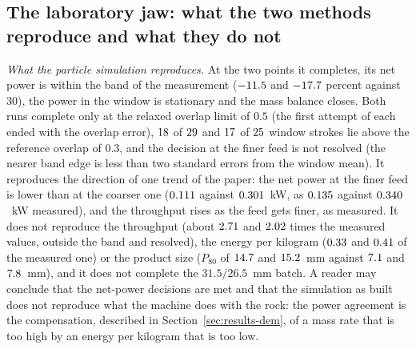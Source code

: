 \subsection{The laboratory jaw: what the two methods reproduce and what they do not}\label{sec:disc-dem}

\emph{What the particle simulation reproduces.} At the two points it completes, its net power is within the band of the measurement ($-11.5$ and $-17.7$ percent against $30$), the power in the window is stationary and the mass balance closes. Both runs complete only at the relaxed overlap limit of $0.5$ (the first attempt of each ended with the overlap error), $18$ of $29$ and $17$ of $25$ window strokes lie above the reference overlap of $0.3$, and the decision at the finer feed is not resolved (the nearer band edge is less than two standard errors from the window mean). It reproduces the direction of one trend of the paper: the net power at the finer feed is lower than at the coarser one ($0.111$ against $0.301$~kW, as $0.135$ against $0.340$~kW measured), and the throughput rises as the feed gets finer, as measured. It does not reproduce the throughput (about $2.71$ and $2.02$ times the measured values, outside the band and resolved), the energy per kilogram ($0.33$ and $0.41$ of the measured one) or the product size ($P_{80}$ of $14.7$ and $15.2$~mm against $7.1$ and $7.8$~mm), and it does not complete the $31.5/26.5$~mm batch. A reader may conclude that the net-power decisions are met and that the simulation as built does not reproduce what the machine does with the rock: the power agreement is the compensation, described in Section~\ref{sec:results-dem}, of a mass rate that is too high by an energy per kilogram that is too low.

